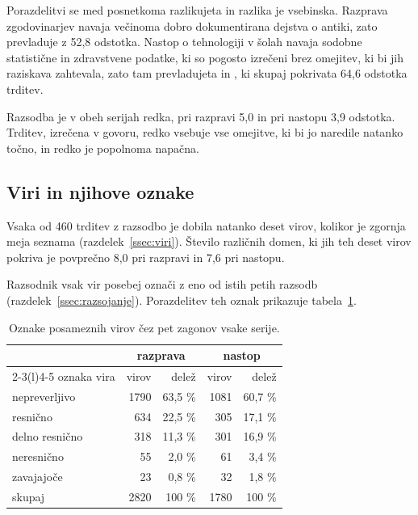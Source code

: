 \documentclass[a4paper, 12pt]{book}
\begin{document}
Porazdelitvi se med posnetkoma razlikujeta in razlika je vsebinska. Razprava
zgodovinarjev navaja večinoma dobro dokumentirana dejstva o antiki, zato
prevladuje  z 52,8 odstotka. Nastop o tehnologiji v šolah navaja
sodobne statistične in zdravstvene podatke, ki so pogosto izrečeni brez omejitev,
ki bi jih raziskava zahtevala, zato tam prevladujeta  in
, ki skupaj pokrivata 64,6 odstotka trditev.

Razsodba  je v obeh serijah redka, pri razpravi 5,0 in pri nastopu
3,9 odstotka. Trditev, izrečena v govoru, redko vsebuje vse omejitve, ki bi jo
naredile natanko točno, in redko je popolnoma napačna.

\subsection{Viri in njihove oznake}
\label{ssec:viri-meritev}

Vsaka od 460 trditev z razsodbo je dobila natanko deset virov, kolikor je
zgornja meja seznama (razdelek~\ref{ssec:viri}).  Število
različnih domen, ki jih teh deset virov pokriva je povprečno 8,0 pri
razpravi in 7,6 pri nastopu.

Razsodnik vsak vir posebej označi z eno od istih petih razsodb
(razdelek~\ref{ssec:razsojanje}). Porazdelitev teh oznak prikazuje
tabela~\ref{tbl:oznake-virov}.

\begin{table}[H]
\centering
\begin{tabular}{lrrrr}
\toprule
& \multicolumn{2}{c}{razprava} & \multicolumn{2}{c}{nastop} \\
\cmidrule(lr){2-3}\cmidrule(l){4-5}
oznaka vira & virov & delež & virov & delež \\
\midrule
nepreverljivo & 1790 & 63,5 \% & 1081 & 60,7 \% \\
resnično          & 634 & 22,5 \% & 305 & 17,1 \% \\
delno resnično    & 318 & 11,3 \% & 301 & 16,9 \% \\
neresnično       & 55 & 2,0 \% & 61 & 3,4 \% \\
zavajajoče    & 23 & 0,8 \% & 32 & 1,8 \% \\
\midrule
skupaj        & 2820 & 100 \% & 1780 & 100 \% \\
\bottomrule
\end{tabular}
\caption{Oznake posameznih virov čez pet zagonov vsake serije.}
\label{tbl:oznake-virov}
\end{table}
\end{document}
